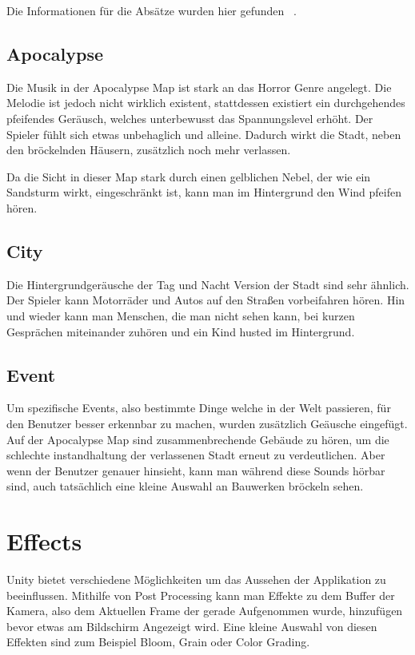 Die Informationen für die Absätze wurden hier gefunden ~\cite{GK_Media_Factory_Sound_Design_2022}.

\subsection{Apocalypse}\label{subsec:apocalypse-background-sound}
Die Musik in der Apocalypse Map ist stark an das Horror Genre angelegt.
Die Melodie ist jedoch nicht wirklich existent, stattdessen existiert ein durchgehendes pfeifendes Ger\"ausch, welches unterbewusst das Spannungslevel erh\"oht.
Der Spieler f\"uhlt sich etwas unbehaglich und alleine.
Dadurch wirkt die Stadt, neben den br\"ockelnden H\"ausern, zus\"atzlich noch mehr verlassen.

Da die Sicht in dieser Map stark durch einen gelblichen Nebel, der wie ein Sandsturm wirkt, eingeschr\"ankt ist, kann man im Hintergrund den Wind pfeifen h\"oren.

\subsection{City}\label{subsec:day-night-background-sound}
Die Hintergrundger\"ausche der Tag und Nacht Version der Stadt sind sehr \"ahnlich.
Der Spieler kann Motorr\"ader und Autos auf den Straßen vorbeifahren h\"oren.
Hin und wieder kann man Menschen, die man nicht sehen kann, bei kurzen Gespr\"achen miteinander zuh\"oren und ein Kind husted im Hintergrund.

\subsection{Event}\label{subsec:building-collapse-sound}
Um spezifische Events, also bestimmte Dinge welche in der Welt passieren, f\"ur den Benutzer besser erkennbar zu machen, wurden zus\"atzlich Ge\"ausche eingef\"ugt.
Auf der Apocalypse Map sind zusammenbrechende Geb\"aude zu h\"oren, um die schlechte instandhaltung der verlassenen Stadt erneut zu verdeutlichen.
Aber wenn der Benutzer genauer hinsieht, kann man w\"ahrend diese Sounds h\"orbar sind, auch tats\"achlich eine kleine Auswahl an Bauwerken br\"ockeln sehen.

\section{Effects}\label{sec:effects}
Unity bietet verschiedene M\"oglichkeiten um das Aussehen der Applikation zu beeinflussen.
Mithilfe von Post Processing kann man Effekte zu dem Buffer der Kamera, also dem Aktuellen Frame der gerade Aufgenommen wurde, hinzuf\"ugen bevor etwas am Bildschirm Angezeigt wird.
Eine kleine Auswahl von diesen Effekten sind zum Beispiel Bloom, Grain oder Color Grading.
~\cite{Unity_Post_Processing_2022}

